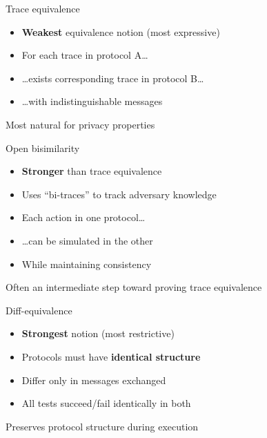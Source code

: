 \documentclass[aspectratio=169, lualatex, handout]{beamer}
\begin{document}
\begin{frame}{Trace equivalence}
	\begin{itemize}
		\item \textbf{Weakest} equivalence notion (most expressive)
		\item For each trace in protocol A\ldots
		\item \ldots exists corresponding trace in protocol B\ldots
		\item \ldots with indistinguishable messages
	\end{itemize}
	\vspace{1em}
	\begin{center}
		\Large
		Most natural for privacy properties
	\end{center}
\end{frame}

\begin{frame}{Open bisimilarity}
	\begin{itemize}
		\item \textbf{Stronger} than trace equivalence
		\item Uses ``bi-traces'' to track adversary knowledge
		\item Each action in one protocol\ldots
		\item \ldots can be simulated in the other
		\item While maintaining consistency
	\end{itemize}
	\vspace{1em}
	\begin{center}
		Often an intermediate step toward proving trace equivalence
	\end{center}
\end{frame}

\begin{frame}{Diff-equivalence}
	\begin{itemize}
		\item \textbf{Strongest} notion (most restrictive)
		\item Protocols must have \textbf{identical structure}
		\item Differ only in messages exchanged
		\item All tests succeed/fail identically in both
	\end{itemize}
	\vspace{1em}
	\begin{center}
		Preserves protocol structure during execution
	\end{center}
\end{frame}
\end{document}
